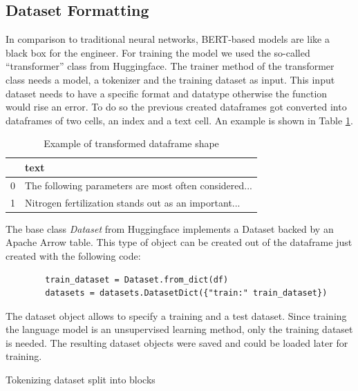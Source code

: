 \subsection{Dataset Formatting}
In comparison to traditional neural networks, BERT-based models are like a black box for the engineer. For training the model we used the so-called “transformer” class from \alert{Huggingface}.  The trainer method of the transformer class needs a model, a tokenizer and the training dataset as input. This input dataset needs to have a specific format and datatype otherwise the function would rise an error.  To do so the previous created dataframes got converted into dataframes of two cells, an index and a text cell. An example is shown in Table \ref{tab:format}.

\begin{table}[H]
	\centering
	\begin{tabular}{ll}
		\hline
		& \textbf{text}                                         \\ \hline
		0 & The following parameters are most often considered... \\ \hline
		1 & Nitrogen fertilization stands out as an important...  \\ \hline
	\end{tabular}
	\caption{Example of transformed dataframe shape}
	\label{tab:format}
\end{table}

The base class \textit{Dataset} from Huggingface implements a Dataset backed by an Apache Arrow table. This type of object can be created out of the dataframe just created with the following code:

\begin{verbatim}
		train_dataset = Dataset.from_dict(df)
		datasets = datasets.DatasetDict({"train:" train_dataset})
\end{verbatim}

The dataset object allows to specify a training and a test dataset. Since training the language model is an unsupervised learning method, only the training dataset is needed. The resulting dataset objects were saved and could be loaded later for training.

\alert{Tokenizing dataset
split into blocks}